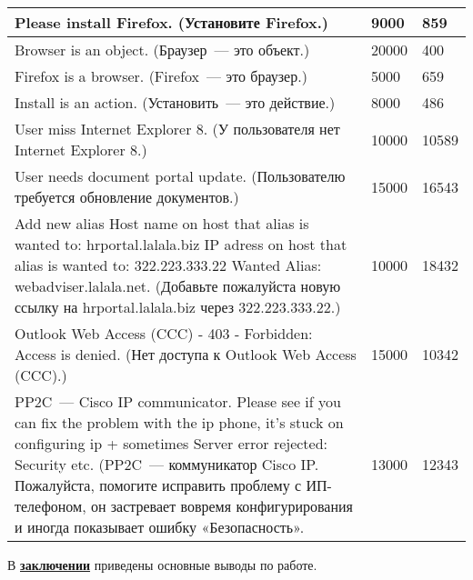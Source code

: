 \begin{longtable}{|p{12cm}|p{2cm}|p{2cm}|}
  \hline
  Please install Firefox. (Установите Firefox.)   & 9000 & 859 \\
  \hline
  Browser is an object. (Браузер~--- это объект.)   & 20000 & 400 \\
  \hline
  Firefox is a browser. (Firefox~--- это браузер.)   & 5000 & 659  \\
  \hline
  Install is an action.  (Установить~--- это действие.)   & 8000 & 486 \\
  \hline
  User miss Internet Explorer 8. (У пользователя нет Internet Explorer 8.)     & 10000 & 10589 \\
  \hline
  User needs document portal update. (Пользователю требуется обновление документов.)    & 15000 & 16543 \\
  \hline
  Add new alias Host name on host that alias is wanted to: hrportal.lalala.biz IP adress on host that alias is wanted to: 322.223.333.22 Wanted Alias:    webadviser.lalala.net. (Добавьте пожалуйста новую ссылку на hrportal.lalala.biz через 322.223.333.22.)    & 10000 & 18432  \\ 
  \hline
  Outlook Web Access (CCC) - 403 - Forbidden: Access is denied. (Нет доступа к Outlook Web Access (CCC).) & 15000 & 10342\\ 
  \hline
  PP2C~--- Cisco IP communicator. Please see if you can fix the problem with the ip phone, it's stuck on configuring ip + sometimes Server error rejected: Security etc. (PP2C~--- коммуникатор Cisco IP. Пожалуйста, помогите исправить проблему с ИП-телефоном, он застревает вовремя конфигурирования и иногда показывает ошибку «Безопасность».  & 13000 & 12343 \\ 
   \hline
  \end{longtable}

В \underline{\textbf{заключении}} приведены основные выводы по работе.


 

\renewcommand{\refname}{\large Публикации автора по теме диссертации}

\insertbiblioall

